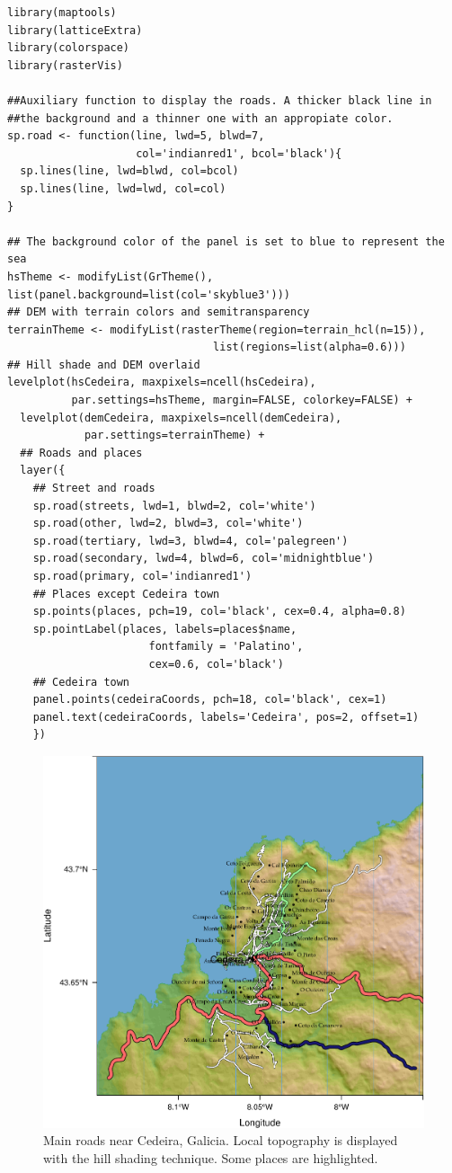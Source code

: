 \documentclass[smallroyalvopaper]{memoir}
\begin{document}
\lstset{language=R,numbers=none}
\begin{lstlisting}
library(maptools)
library(latticeExtra)
library(colorspace)
library(rasterVis)

##Auxiliary function to display the roads. A thicker black line in
##the background and a thinner one with an appropiate color.
sp.road <- function(line, lwd=5, blwd=7,
                    col='indianred1', bcol='black'){
  sp.lines(line, lwd=blwd, col=bcol)
  sp.lines(line, lwd=lwd, col=col)
}

## The background color of the panel is set to blue to represent the sea
hsTheme <- modifyList(GrTheme(), list(panel.background=list(col='skyblue3')))
## DEM with terrain colors and semitransparency
terrainTheme <- modifyList(rasterTheme(region=terrain_hcl(n=15)),
                                list(regions=list(alpha=0.6)))
## Hill shade and DEM overlaid
levelplot(hsCedeira, maxpixels=ncell(hsCedeira),
          par.settings=hsTheme, margin=FALSE, colorkey=FALSE) +
  levelplot(demCedeira, maxpixels=ncell(demCedeira),
            par.settings=terrainTheme) +
  ## Roads and places
  layer({
    ## Street and roads
    sp.road(streets, lwd=1, blwd=2, col='white')
    sp.road(other, lwd=2, blwd=3, col='white')
    sp.road(tertiary, lwd=3, blwd=4, col='palegreen')
    sp.road(secondary, lwd=4, blwd=6, col='midnightblue')
    sp.road(primary, col='indianred1')
    ## Places except Cedeira town
    sp.points(places, pch=19, col='black', cex=0.4, alpha=0.8)
    sp.pointLabel(places, labels=places$name,
                      fontfamily = 'Palatino', 
                      cex=0.6, col='black')
    ## Cedeira town
    panel.points(cedeiraCoords, pch=18, col='black', cex=1)
    panel.text(cedeiraCoords, labels='Cedeira', pos=2, offset=1)
    })
\end{lstlisting}

\begin{figure}[htb]
\centering
\includegraphics[width=.9\linewidth]{figs/cedeiraOsmar.pdf}
\caption{\label{fig:cedeiraOsmar}Main roads near Cedeira, Galicia. Local topography is displayed with the hill shading technique. Some places are highlighted.}
\end{figure}
\end{document}
